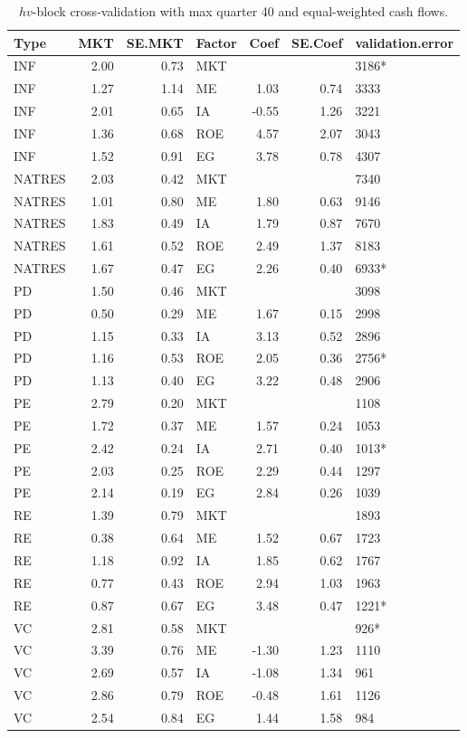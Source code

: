 \documentclass[12pt]{article}
\begin{document}
\begin{table}[ht]
	\centering
	\begin{tabular}{lrrlrrl}
		Type & MKT & SE.MKT & Factor & Coef & SE.Coef & validation.error \\ 
		\hline
		\hline
		INF & 2.00 & 0.73 & MKT &  &  & 3186* \\ 
		INF & 1.27 & 1.14 & ME & 1.03 & 0.74 & 3333 \\ 
		INF & 2.01 & 0.65 & IA & -0.55 & 1.26 & 3221 \\ 
		INF & 1.36 & 0.68 & ROE & 4.57 & 2.07 & 3043 \\ 
		INF & 1.52 & 0.91 & EG & 3.78 & 0.78 & 4307 \\ 
		\hline
		NATRES & 2.03 & 0.42 & MKT &  &  & 7340 \\ 
		NATRES & 1.01 & 0.80 & ME & 1.80 & 0.63 & 9146 \\ 
		NATRES & 1.83 & 0.49 & IA & 1.79 & 0.87 & 7670 \\ 
		NATRES & 1.61 & 0.52 & ROE & 2.49 & 1.37 & 8183 \\ 
		NATRES & 1.67 & 0.47 & EG & 2.26 & 0.40 & 6933* \\ 
		\hline
		PD & 1.50 & 0.46 & MKT &  &  & 3098 \\ 
		PD & 0.50 & 0.29 & ME & 1.67 & 0.15 & 2998 \\ 
		PD & 1.15 & 0.33 & IA & 3.13 & 0.52 & 2896 \\ 
		PD & 1.16 & 0.53 & ROE & 2.05 & 0.36 & 2756* \\ 
		PD & 1.13 & 0.40 & EG & 3.22 & 0.48 & 2906 \\ 
		\hline
		PE & 2.79 & 0.20 & MKT &  &  & 1108 \\ 
		PE & 1.72 & 0.37 & ME & 1.57 & 0.24 & 1053 \\ 
		PE & 2.42 & 0.24 & IA & 2.71 & 0.40 & 1013* \\ 
		PE & 2.03 & 0.25 & ROE & 2.29 & 0.44 & 1297 \\ 
		PE & 2.14 & 0.19 & EG & 2.84 & 0.26 & 1039 \\ 
		\hline
		RE & 1.39 & 0.79 & MKT &  &  & 1893 \\ 
		RE & 0.38 & 0.64 & ME & 1.52 & 0.67 & 1723 \\ 
		RE & 1.18 & 0.92 & IA & 1.85 & 0.62 & 1767 \\ 
		RE & 0.77 & 0.43 & ROE & 2.94 & 1.03 & 1963 \\ 
		RE & 0.87 & 0.67 & EG & 3.48 & 0.47 & 1221* \\ 
		\hline
		VC & 2.81 & 0.58 & MKT &  &  & 926* \\ 
		VC & 3.39 & 0.76 & ME & -1.30 & 1.23 & 1110 \\ 
		VC & 2.69 & 0.57 & IA & -1.08 & 1.34 & 961 \\ 
		VC & 2.86 & 0.79 & ROE & -0.48 & 1.61 & 1126 \\ 
		VC & 2.54 & 0.84 & EG & 1.44 & 1.58 & 984 \\ 
		\hline
		\hline
	\end{tabular}
	\caption{$hv$-block cross-validation with max quarter 40 and equal-weighted cash flows.}
	\label{tab:cv_40_ew_dep} 
\end{table}
\end{document}
